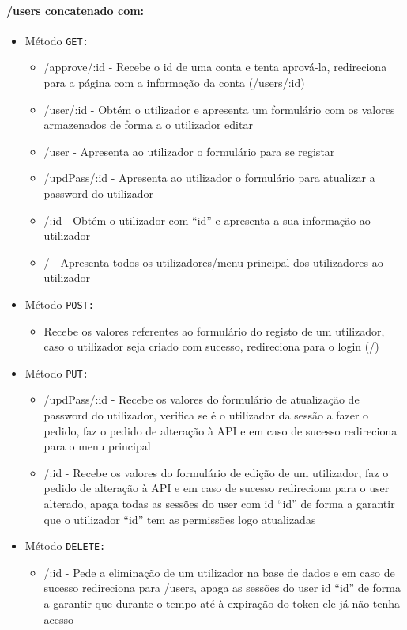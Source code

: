 \paragraph{/users concatenado com:}
        \begin{itemize}
            \item Método \texttt{GET:}
                \begin{itemize}
                    \item /approve/:id - Recebe o id de uma conta e tenta aprová-la, redireciona para a página com a informação da conta (/users/:id)
                    \item /user/:id - Obtém o utilizador e apresenta um formulário com os valores armazenados de forma a o utilizador editar
                    \item /user - Apresenta ao utilizador o formulário para se registar
                    \item /updPass/:id - Apresenta ao utilizador o formulário para atualizar a password do utilizador
                    \item /:id - Obtém o utilizador com ``id'' e apresenta a sua informação ao utilizador
                    \item / - Apresenta todos os utilizadores/menu principal dos utilizadores ao utilizador
                \end{itemize}
            \item Método \texttt{POST:}
                \begin{itemize}
                    \item Recebe os valores referentes ao formulário do registo de um utilizador, caso o utilizador seja criado com sucesso, redireciona para o login (/)
                \end{itemize}
            \item Método \texttt{PUT:}
                \begin{itemize}
                    \item /updPass/:id - Recebe os valores do formulário de atualização de password do utilizador, verifica se é o utilizador da sessão a fazer o pedido, faz o pedido de alteração à API e em caso de sucesso redireciona para o menu principal
                    \item /:id - Recebe os valores do formulário de edição de um utilizador, faz o pedido de alteração à API e em caso de sucesso redireciona para o user alterado, apaga todas as sessões do user com id ``id'' de forma a garantir que o utilizador ``id'' tem as permissões logo atualizadas
                \end{itemize}
            \item Método \texttt{DELETE:}
                \begin{itemize}
                    \item /:id -  Pede a eliminação de um utilizador na base de dados e em caso de sucesso redireciona para /users, apaga as sessões do user id ``id'' de forma a garantir que durante o tempo até à expiração do token ele já não tenha acesso
                \end{itemize}
        \end{itemize}

